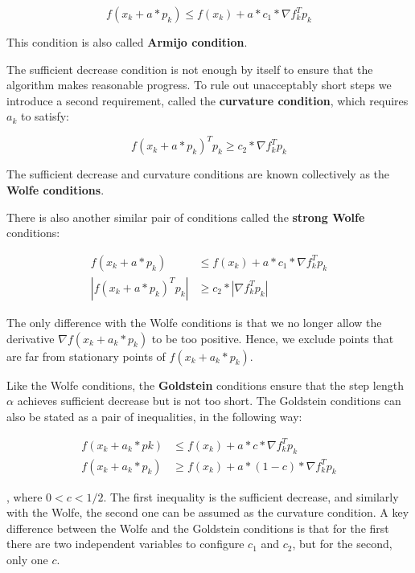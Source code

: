 \documentclass[a4paper,11pt]{article}
\numberwithin{equation}{section} %
\begin{document}
\begin{equation}
f(x_k + a*p_k) \leq f(x_k) + a * c_1 * \nabla f_k^T p_k
\end{equation}

This condition is also called \textbf{Armijo condition}.

The sufficient decrease condition is not enough by itself to ensure that the algorithm
makes reasonable progress. To rule out unacceptably short steps we introduce a second requirement,
called the \textbf{curvature condition}, which requires $a_k$ to satisfy:

\begin{equation}
f(x_k + a*p_k)^T p_k \ge c_2 * \nabla f_k^Tp_k
\end{equation}

The sufficient decrease and curvature conditions are known collectively as the \textbf{Wolfe
conditions}.

There is also another similar pair of conditions called the \textbf{strong Wolfe} conditions:

\begin{align}
f(x_k + a*p_k) &\leq f(x_k) + a * c_1 * \nabla f_k^T p_k \\
|f(x_k + a*p_k)^T p_k| &\ge c_2 * |\nabla f_k^Tp_k|
\end{align}

The only difference with the Wolfe conditions is that we no longer
allow the derivative $\nabla f(x_k + a_k * p_k)$ to be too positive. Hence, we exclude points that are far from stationary points of $f(x_k + a_k*p_k)$.


Like the Wolfe conditions, the \textbf{Goldstein} conditions ensure that the step length $\alpha$
achieves sufficient decrease but is not too short. The Goldstein conditions can also be stated
as a pair of inequalities, in the following way:

\begin{align}
    f(x_k + a_k*pk) &\leq f(x_k) + a*c*\nabla f_k^T p_k \\
    f(x_k + a_k*p_k) & \ge f(x_k) + a*(1-c)*\nabla f_k^T p_k
\end{align}

, where $0 < c < 1/2$. The first inequality is the sufficient decrease, and similarly with the Wolfe, the second one can be assumed as the curvature condition. A key difference between the Wolfe and the Goldstein conditions is that for the first there are two independent variables to configure $c_1$ and $c_2$, but for the second, only one $c$.
\end{document}
